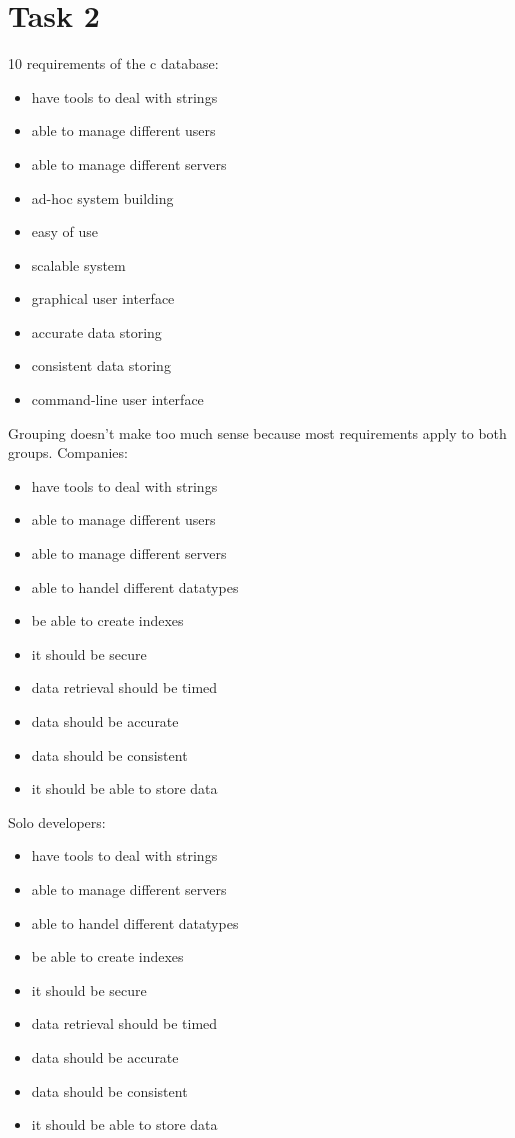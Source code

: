 \chapter{Task 2}
\begin{elenco}
10 requirements of the c database:
\begin{itemize}
	\item have tools to deal with strings
	\item able to manage different users
    \item able to manage different servers
    \item ad-hoc system building 
    \item easy of use
    \item scalable system
    \item graphical user interface
    \item accurate data storing
    \item consistent data storing
    \item command-line user interface
\end{itemize} 

\item Grouping doesn't make too much sense because most requirements apply to both groups.
Companies:
\begin{itemize}
    \item have tools to deal with strings
    \item able to manage different users
    \item able to manage different servers
    \item able to handel different datatypes
    \item be able to create indexes
    \item it should be secure
    \item data retrieval should be timed
    \item data should be accurate
    \item data should be consistent
    \item it should be able to store data
\end{itemize}
Solo developers:
\begin{itemize}
    \item have tools to deal with strings
    \item able to manage different servers
    \item able to handel different datatypes
    \item be able to create indexes
    \item it should be secure
    \item data retrieval should be timed
    \item data should be accurate
    \item data should be consistent
    \item it should be able to store data
\end{itemize}


\end{elenco}
